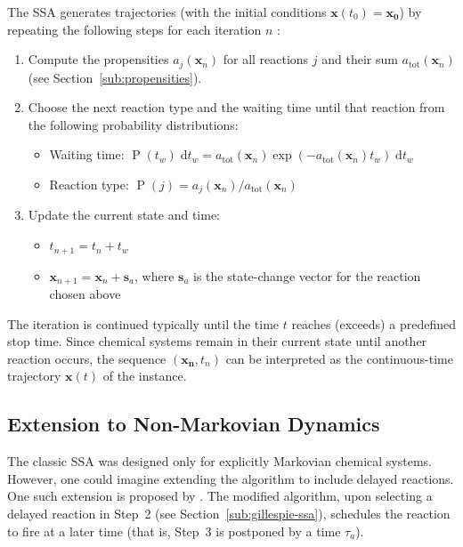\documentclass[english,letterpaper,12pt]{article}
\newcommand{\dee}{\;\mathrm{d}}
\renewcommand{\vec}[1]{\ensuremath{\mathbf{#1}}}
\DeclareMathOperator{\Prob}{P}
\begin{document}
\begin{doublespacing}
The SSA generates trajectories (with the initial conditions $\vec{x}(t_0) = \vec{x_0}$) by repeating the following steps for each iteration $n$ \cite{gillespie-ssa}:
\begin{enumerate}
    \item Compute the propensities $a_j(\vec{x}_n)$ for all reactions $j$ and their sum $a_\text{tot}(\vec{x}_n)$ (see Section~\ref{sub:propensities}).
    \item Choose the next reaction type and the waiting time until that reaction from the following probability distributions:
    \begin{itemize}
        \item Waiting time: $\Prob(t_w)\dee t_w = a_\text{tot}(\vec{x}_n) \exp(-a_\text{tot}(\vec{x}_n) t_w) \dee t_w$
        \item Reaction type: $\Prob(j) = a_j(\vec{x}_n) / a_\text{tot}(\vec{x}_n)$
    \end{itemize}
    \item Update the current state and time:
    \begin{itemize}
        \item $t_{n+1} = t_n + t_w$
        \item $\vec{x}_{n+1} = \vec{x}_n + \vec{s}_a$, where $\vec{s}_a$ is the state-change vector for the reaction chosen above
    \end{itemize}
\end{enumerate}
The iteration is continued typically until the time $t$ reaches (exceeds) a predefined stop time. Since chemical systems  remain in their current state until another reaction occurs, the sequence $(\vec{x_n}, t_n)$ can be interpreted as the continuous-time trajectory $\vec{x}(t)$ of the instance.


\subsection{Extension to Non-Markovian Dynamics} %
\label{sub:non-markovian}

The classic SSA was designed only for explicitly Markovian chemical systems. However, one could imagine extending the algorithm to include delayed reactions. One such extension is proposed by \cite{delay-oscillations}. The modified algorithm, upon selecting a delayed reaction in Step~2 (see Section~\ref{sub:gillespie-ssa}), schedules the reaction to fire at a later time (that is, Step~3 is postponed by a time $\tau_a$). 


\end{doublespacing}
\end{document}
